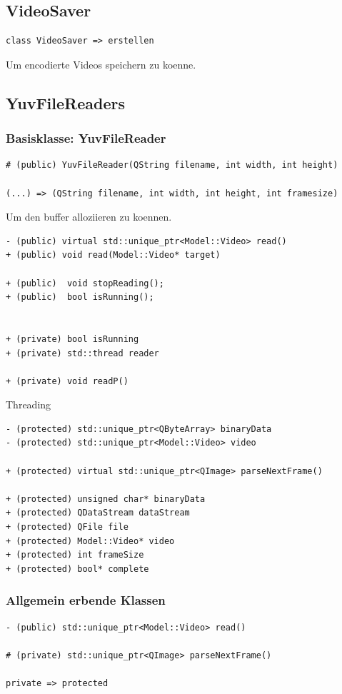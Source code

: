 \documentclass[parskip=full]{scrartcl}
\begin{document}
\subsection{VideoSaver}
\begin{verbatim}
class VideoSaver => erstellen
\end{verbatim}
Um encodierte Videos speichern zu koenne.
\subsection{YuvFileReaders}
\subsubsection{Basisklasse: YuvFileReader}
\begin{verbatim}
# (public) YuvFileReader(QString filename, int width, int height)

(...) => (QString filename, int width, int height, int framesize)
\end{verbatim}
Um den buffer alloziieren zu koennen.

\begin{verbatim}
- (public) virtual std::unique_ptr<Model::Video> read()
+ (public) void read(Model::Video* target)

+ (public)	void stopReading();
+ (public)	bool isRunning();
	
	
+ (private) bool isRunning
+ (private) std::thread reader

+ (private) void readP()
\end{verbatim}
Threading
\begin{verbatim}
- (protected) std::unique_ptr<QByteArray> binaryData
- (protected) std::unique_ptr<Model::Video> video

+ (protected) virtual std::unique_ptr<QImage> parseNextFrame()

+ (protected) unsigned char* binaryData
+ (protected) QDataStream dataStream
+ (protected) QFile file
+ (protected) Model::Video* video
+ (protected) int frameSize
+ (protected) bool* complete
\end{verbatim}
\subsubsection{Allgemein erbende Klassen}
\begin{verbatim}
- (public) std::unique_ptr<Model::Video> read()

# (private) std::unique_ptr<QImage> parseNextFrame()

private => protected
\end{verbatim}
\end{document}
